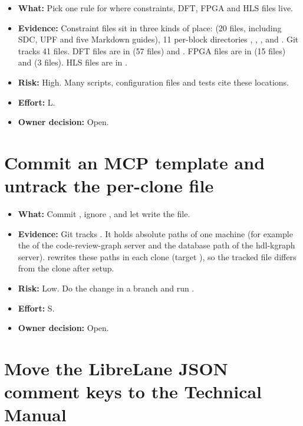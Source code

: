 \begin{itemize}
\item \textbf{What:} Pick one rule for where constraints, DFT, FPGA and HLS files live.
\item \textbf{Evidence:} Constraint files sit in three kinds of place:  (20 files, including SDC, UPF and five Markdown guides), 11 per-block directories , , ,  and . Git tracks 41  files. DFT files are in  (57 files) and . FPGA files are in  (15 files) and  (3 files). HLS files are in .
\item \textbf{Risk:} High. Many scripts, configuration files and tests cite these locations.
\item \textbf{Effort:} L.
\item \textbf{Owner decision:} Open.
\end{itemize}

\section{Commit an MCP template and untrack the per-clone file}\label{um:guide:cleanup-recommendations:mcp-json}

\begin{itemize}
\item \textbf{What:} Commit , ignore , and let  write the file.
\item \textbf{Evidence:} Git tracks . It holds absolute paths of one machine (for example the  of the code-review-graph server and the database path of the hdl-kgraph server).  rewrites these paths in each clone (target ), so the tracked file differs from the clone after setup.
\item \textbf{Risk:} Low. Do the change in a branch and run .
\item \textbf{Effort:} S.
\item \textbf{Owner decision:} Open.
\end{itemize}

\section{Move the LibreLane JSON comment keys to the Technical Manual}\label{um:guide:cleanup-recommendations:json-comments}


